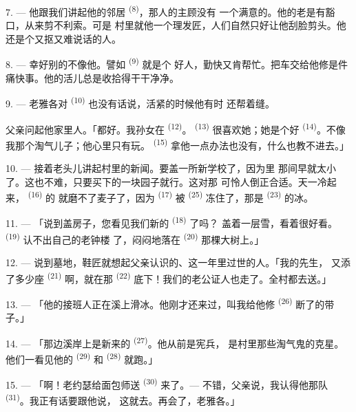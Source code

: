 7. --- 他跟我们讲起他的邻居 \textsuperscript{(8)}，那人的主顾没有
一个满意的。他的老是有豁口，从来剪不利索。可是
村里就他一个理发匠，人们自然只好让他刮脸剪头。他还是个又抠又难说话的人。

8. --- 幸好别的不像他。譬如 \textsuperscript{(9)} 就是个
好人，勤快又肯帮忙。把车交给他修是件痛快事。他的活儿总是收拾得干干净净。

9. --- 老雅各对 \textsuperscript{(10)} 也没有话说，活紧的时候他有时
还帮着缝。

父亲问起他家里人。「都好。我孙女在 \textsuperscript{(12)}。
 \textsuperscript{(13)} 很喜欢她；她是个好
\textsuperscript{(14)}。不像我那个淘气儿子；他心里只有玩。
\textsuperscript{(15)} 拿他一点办法也没有，什么也教不进去。」

\VUsaut{3.0mm}
\VUsaut{3.0mm}

10. --- 接着老头儿讲起村里的新闻。要盖一所新学校了，因为里
那间早就太小了。这也不难，只要买下的一块园子就行。这对那
可怜人倒正合适。天一冷起来， \textsuperscript{(16)} 的
就磨不了麦子了，因为 \textsuperscript{(17)} 被
\textsuperscript{(25)} 冻住了，那是 \textsuperscript{(23)} 的冰。

11. --- 「说到盖房子，您看见我们新的 \textsuperscript{(18)} 了吗？
盖着一层雪，看着很好看。 \textsuperscript{(19)} 认不出自己的老钟楼
了，闷闷地落在 \textsuperscript{(20)} 那棵大树上。」

12. --- 说到墓地，鞋匠就想起父亲认识的、这一年里过世的人。「我的先生，
又添了多少座 \textsuperscript{(21)} 啊，就在那
\textsuperscript{(22)} 底下！我们的老公证人也走了。全村都去送。」

13. --- 「他的接班人正在溪上滑冰。他刚才还来过，叫我给他修
\textsuperscript{(26)} 断了的带子。」

14. --- 「那边溪岸上是新来的 \textsuperscript{(27)}。他从前是宪兵，
是村里那些淘气鬼的克星。他们一看见他的 \textsuperscript{(29)} 和
 \textsuperscript{(28)} 就跑。」

15. --- 「啊！老约瑟给面包师送 \textsuperscript{(30)} 来了。---
不错，父亲说，我认得他那队 \textsuperscript{(31)}。我正有话要跟他说，
这就去。再会了，老雅各。」

